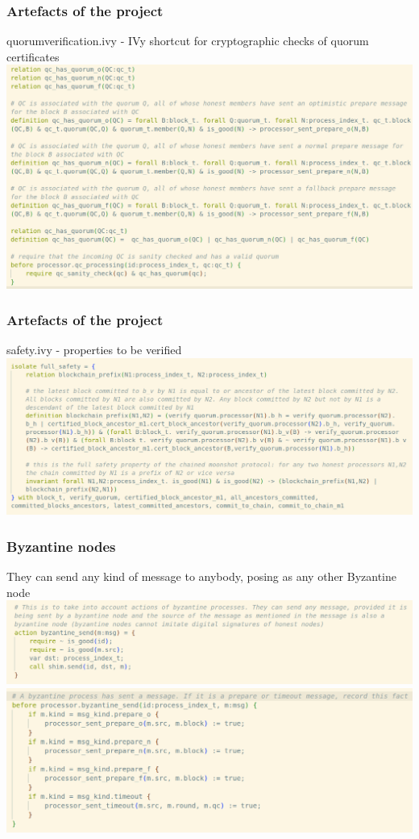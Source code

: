 \documentclass{beamer}
\begin{document}
\begin{frame}
    \frametitle{Artefacts of the project}
    \alert{quorum\textunderscore{}verification.ivy} - IVy shortcut
    for cryptographic checks of quorum certificates
    \includegraphics[scale=0.25]{QuorumDef.png}
\end{frame}

\begin{frame}
    \frametitle{Artefacts of the project}
    \alert{safety.ivy} - properties to be verified
    \includegraphics[scale=0.25]{FullSafety.png}
\end{frame}

\begin{frame}
    \frametitle{Byzantine nodes}
    They can send any kind of message to anybody, posing as any other
    Byzantine node
    \includegraphics[scale=0.25]{ByzantineSendMsg.png}
    \includegraphics[scale=0.25]{RecordByzantineAction.png}
\end{frame}
\end{document}
